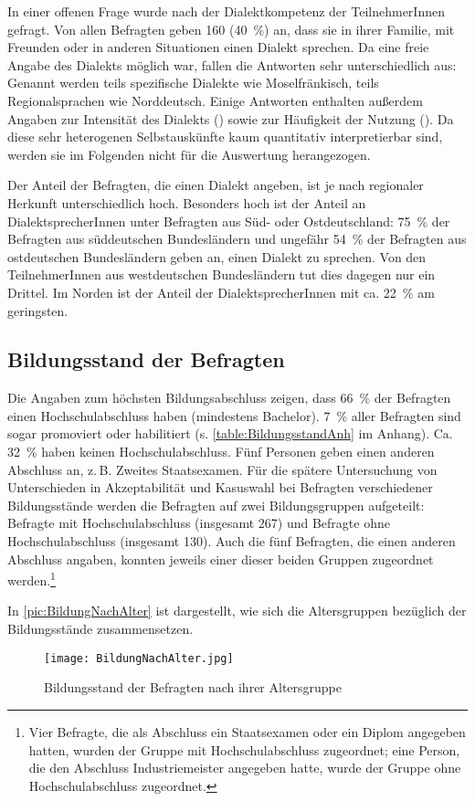 In einer offenen Frage wurde nach der Dialektkompetenz der TeilnehmerInnen gefragt. 
Von allen Befragten geben 160 (40~\%) an, dass sie in ihrer Familie, mit Freunden oder in anderen Situationen einen Dialekt sprechen. 
Da eine freie Angabe des Dialekts möglich war, fallen die Antworten sehr unterschiedlich aus: 
Genannt werden teils spezifische Dialekte wie Moselfränkisch, teils Regionalsprachen wie Norddeutsch.  
Einige Antworten enthalten außerdem Angaben zur Intensität des Dialekts () sowie zur Häufigkeit der Nutzung (). 
Da diese sehr heterogenen Selbstauskünfte kaum quantitativ interpretierbar sind, werden sie im Folgenden nicht für die Auswertung herangezogen.

Der Anteil der Befragten, die einen Dialekt angeben, ist je nach regionaler Herkunft unterschiedlich hoch. 
Besonders hoch ist der Anteil an DialektsprecherInnen unter Befragten aus Süd- oder Ostdeutschland: 
75~\% der Befragten aus süddeutschen Bundesländern und ungefähr 54~\% der Befragten aus ostdeutschen Bundesländern geben an, einen Dialekt zu sprechen. 
Von den TeilnehmerInnen aus westdeutschen Bundesländern tut dies dagegen nur ein Drittel.
Im Norden ist der Anteil der DialektsprecherInnen mit ca. 22~\% am geringsten. 
\subsection{Bildungsstand der Befragten}
\label{sec:Bildung}
Die Angaben zum höchsten Bildungsabschluss zeigen, dass 66~\% der Befragten einen Hochschulabschluss haben (mindestens Bachelor). 7~\% aller Befragten sind sogar promoviert oder habilitiert (s. \autoref{table:BildungsstandAnh} im Anhang). 
Ca. 32~\% haben keinen Hochschulabschluss. 
Fünf Personen geben einen anderen Abschluss an, z.\,B. Zweites Staatsexamen. 
Für die spätere Untersuchung von Unterschieden in Akzeptabilität und Kasuswahl bei Befragten verschiedener Bildungsstände werden die Befragten auf zwei Bildungsgruppen aufgeteilt: 
Befragte mit Hochschulabschluss (insgesamt 267) und Befragte ohne Hochschulabschluss (insgesamt 130). 
Auch die fünf Befragten, die einen anderen Abschluss angaben, konnten jeweils einer dieser beiden Gruppen zugeordnet werden.\footnote{Vier Befragte, die als Abschluss ein Staatsexamen oder ein Diplom angegeben hatten, wurden der Gruppe mit Hochschulabschluss zugeordnet; eine Person, die den Abschluss Industriemeister angegeben hatte, wurde der Gruppe ohne Hochschulabschluss zugeordnet.}

In \autoref{pic:BildungNachAlter} ist dargestellt, wie sich die Altersgruppen bezüglich der Bildungsstände zusammensetzen.
\begin{figure}
\centering
\texttt{[image: BildungNachAlter.jpg]}
\caption{Bildungsstand der Befragten nach ihrer Altersgruppe}
\label{pic:BildungNachAlter}
\end{figure}
 
